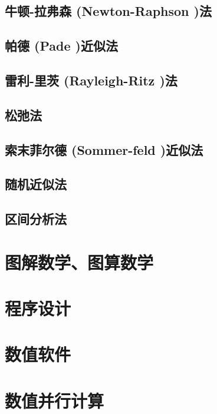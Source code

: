 \documentclass[UTF8]{../09-Mathematics}
\begin{document}
\section{牛顿-拉弗森 (Newton-Raphson )法}
\section{帕德 (Pade )近似法}
\section{雷利-里茨 (Rayleigh-Ritz )法}
\section{松弛法}
\section{索末菲尔德 (Sommer-feld )近似法}
\section{随机近似法}
\section{区间分析法}



\chapter{图解数学、图算数学}
\chapter{程序设计}
\chapter{数值软件}
\chapter{数值并行计算}
\end{document}
